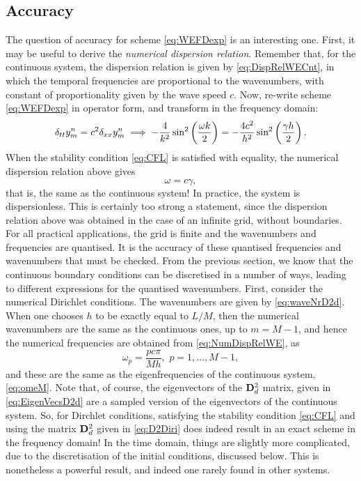 \subsection{Accuracy}


The question of accuracy for scheme \eqref{eq:WEFDexp} is an interesting one. First, it may be useful to derive the \emph{numerical dispersion relation}. Remember that, for the continuous system, the dispersion relation is given by \eqref{eq:DispRelWECnt}, in which the temporal frequencies are proportional to the wavenumbers, with constant of proportionality given by the wave speed $c$. Now, re-write scheme \eqref{eq:WEFDexp} in operator form, and transform in the frequency domain:
\begin{equation}\label{eq:WEfdOperator}
\delta_{tt} y^n_m = c^2 \delta_{xx} y^n_m \implies -\frac{4}{k^2}\sin^2 \left( \frac{\omega k}{2}\right) = -\frac{4 c^2}{h^2}\sin^2 \left( \frac{\gamma h}{2}\right).{}
\end{equation}
When the stability condition \eqref{eq:CFL} is satisfied with equality, the numerical dispersion relation above gives
\begin{equation}\label{eq:NumDispRelWE}
\omega = c \gamma,
\end{equation}
that is, the same as the continuous system! In practice, the system is dispersionless. This is certainly too strong a statement, since the dispersion relation above was obtained in the case of an infinite grid, without boundaries. For all practical applications, the grid is finite and the wavenumbers and frequencies are quantised. It is the accuracy of these quantised frequencies and wavenumbers that must be checked. From the previous section, we know that the continuous boundary conditions can be discretised in a number of ways, leading to different expressions for the quantised wavenumbers. First, consider the numerical Dirichlet conditions. The wavenumbers are given by \eqref{eq:waveNrD2d}. When one chooses $h$ to be exactly equal to $L/M$, then the numerical wavenumbers are the same as the continuous ones, up to $m=M-1$, and hence the numerical frequencies are obtained from \eqref{eq:NumDispRelWE}, as
\begin{equation}
\omega_p = \frac{pc\pi}{Mh}, \,\, p = 1,...,M-1,
\end{equation}
and these are the same as the eigenfrequencies of the continuous system, \eqref{eq:omeM}. Note that, of course, the eigenvectors of the ${\bf D}^2_{d}$ matrix, given in \eqref{eq:EigenVecsD2d} are a sampled version of the eigenvectors of the continuous system. So, for Dirchlet conditions, satisfying the stability condition \eqref{eq:CFL} and using the matrix ${\bf D}^2_{d}$ given in \eqref{eq:D2Diri} does indeed result in an exact scheme in the frequency domain! In the time domain, things are slightly more complicated, due to the discretisation of the initial conditions, discussed below. This is nonetheless a powerful result, and indeed one rarely found in other systems. 

